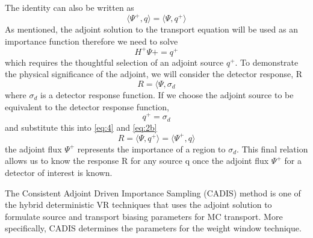 The identity can also be written as
\begin{equation} \label{eq:2b}
		\langle \Psi^{+} , q \rangle =
		\langle \Psi, q^{+} \rangle
\end{equation}
As mentioned, the adjoint solution to the transport
equation will be used as an importance function therefore we need to solve
\begin{equation} \label{eq:3}
		H^{+}\Psi{+} = q^{+}
\end{equation}
which requires the thoughtful selection of an adjoint source $q^{+}$.
To demonstrate the physical significance of the adjoint, we will consider the
detector response, R
\begin{equation} \label{eq:4}
		R = \langle \Psi, \sigma_{d}
\end{equation}
where $\sigma_{d}$ is a detector response function.
If we choose the adjoint source to be equivalent to the detector response
function,
\begin{equation} \label{eq:5}
		q^{+} = \sigma_{d}
\end{equation}
and substitute this into \ref{eq:4} and \ref{eq:2b} 
\begin{equation}
		R = \langle \Psi, q^{+} \rangle = \langle \Psi^{+}, q \rangle
\end{equation}
the adjoint flux $\Psi^{+}$ represents the importance of a region to
$\sigma_{d}$.
This final relation allows us to know the response R for any source q once the
adjoint flux $\Psi^{+}$ for a detector of interest is known.

The Consistent Adjoint Driven Importance Sampling (CADIS) method is one of the
hybrid deterministic  VR
techniques that uses the adjoint solution to 
formulate source and transport biasing parameters for MC transport.
More specifically, CADIS determines the parameters for the weight window
technique.



